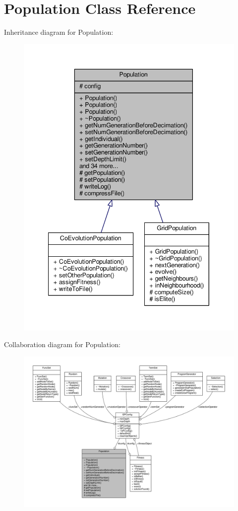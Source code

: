 \hypertarget{classPopulation}{}\section{Population Class Reference}
\label{classPopulation}


Inheritance diagram for Population\+:
\nopagebreak
\begin{figure}[H]
\begin{center}
\leavevmode
\includegraphics[width=340pt]{classPopulation__inherit__graph}
\end{center}
\end{figure}


Collaboration diagram for Population\+:
\nopagebreak
\begin{figure}[H]
\begin{center}
\leavevmode
\includegraphics[width=350pt]{classPopulation__coll__graph}
\end{center}
\end{figure}
